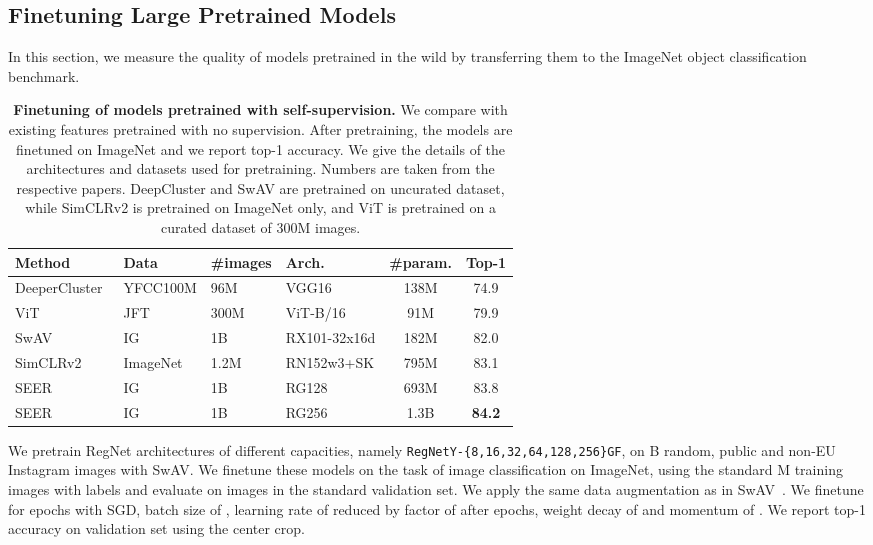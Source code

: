 \documentclass[final]{cvpr}
\renewcommand{\paragraph}[1]{\vspace{0.07in}\noindent {\bf #1}}
\begin{document}
\subsection{Finetuning Large Pretrained Models}

In this section, we measure the quality of models pretrained in the wild by transferring them to the ImageNet object classification benchmark.


\begin{table*}[t]
\centering
\begin{tabular}{ l l l l c c}
\toprule
 Method & Data & \#images& Arch. & \#param. & Top-1\\
\midrule
DeeperCluster~\cite{caron2019unsupervised} & YFCC100M & 96M & VGG16 & 138M & 74.9\\ 
ViT~\cite{dosovitskiy2020image} & JFT & 300M & ViT-B/16 & \phantom{0}91M & 79.9\\
SwAV~\cite{caron2020unsupervised} & IG & 1B & RX101-32x16d & 182M & 82.0 \\
SimCLRv2~\cite{chen2020big} & ImageNet & 1.2M & RN152w3+SK & 795M & 83.1\\
\midrule
SEER & IG & 1B & RG128 & 693M & 83.8\\
SEER & IG & 1B & RG256 & 1.3B & \textbf{84.2}\\
\bottomrule
\end{tabular}
\vspace{.2em}
\caption{
\textbf{Finetuning of models pretrained with self-supervision.}
We compare with existing features pretrained with no supervision.
After pretraining, the models are finetuned on ImageNet and we report top-1 accuracy.
We give the details of the architectures and datasets used for pretraining.
Numbers are taken from the respective papers.
DeepCluster and SwAV are pretrained on uncurated dataset, while SimCLRv2 is pretrained on ImageNet only, and ViT is pretrained on a curated dataset of 300M images.
}
\label{tab:finetune}
\end{table*}

\paragraph{Experimental setting.}
We pretrain  RegNet architectures of different capacities, namely \texttt{RegNetY-\{8,16,32,64,128,256\}GF}, on B random, public and non-EU Instagram images with SwAV.
We finetune these models on the task of image classification on ImageNet, using the standard M training images with labels and evaluate on  images in the standard validation set.
We apply the same data augmentation as in SwAV~\cite{caron2020unsupervised}.
We finetune for  epochs with SGD, batch size of , learning rate of  reduced by factor of  after  epochs, weight decay of  and momentum of .
We report top-1 accuracy on validation set using the  center crop.
\end{document}
